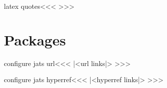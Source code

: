 \<latex quotes\><<<
   {}{}
   {\ifvmode\IgnorePar\fi\EndP%
    }
   {\IgnorePar\EndP{}\ShowPar\ShowIndent}
>>>

\chapter{Packages}

\<configure jats url\><<<
|<url links|>
>>>

\<configure jats hyperref\><<<
|<hyperref links|>
>>>

\endinput
